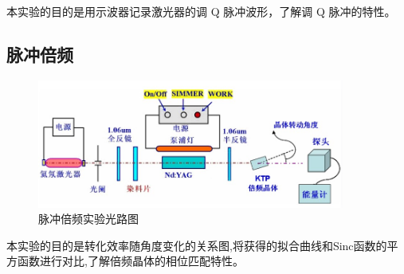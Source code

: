 \documentclass[a4paper,UTF8]{ctexart}
\begin{document}
本实验的目的是用示波器记录激光器的调 Q 脉冲波形，了解调 Q 脉冲的特性。

\subsection{脉冲倍频}

\begin{figure}[H]
    \centering
    \begin{minipage}[b]{0.9\textwidth}
        \centering
        \includegraphics[width=0.9\textwidth]{./fig6.jpg}
        \caption{脉冲倍频实验光路图}
    \end{minipage}
\end{figure}

本实验的目的是转化效率随角度变化的关系图,将获得的拟合曲线和Sinc函数的平方函数进行对比,了解倍频晶体的相位匹配特性。
\end{document}
